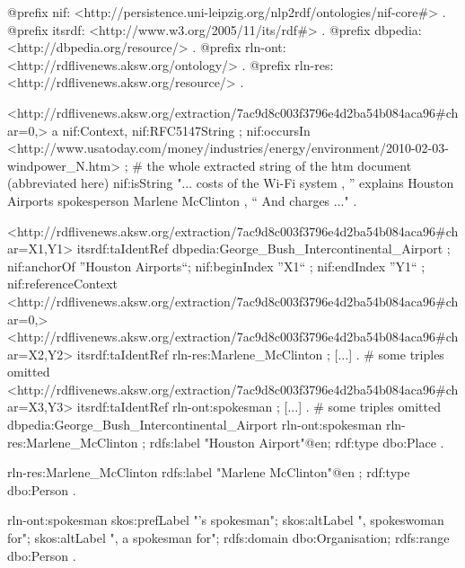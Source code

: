 @prefix nif: <http://persistence.uni-leipzig.org/nlp2rdf/ontologies/nif-core#> .
@prefix itsrdf: <http://www.w3.org/2005/11/its/rdf#> .
@prefix dbpedia: <http://dbpedia.org/resource/> .
@prefix rln-ont: <http://rdflivenews.aksw.org/ontology/> .
@prefix rln-res: <http://rdflivenews.aksw.org/resource/> .

<http://rdflivenews.aksw.org/extraction/7ac9d8c003f3796e4d2ba54b084aca96#char=0,>
    a nif:Context, nif:RFC5147String ;
    nif:occursIn <http://www.usatoday.com/money/industries/energy/environment/2010-02-03-windpower_N.htm> ;
# the whole extracted string of the htm document (abbreviated here)
    nif:isString "... costs of the Wi-Fi system , '' explains Houston Airports spokesperson Marlene McClinton , `` And charges ..." .

<http://rdflivenews.aksw.org/extraction/7ac9d8c003f3796e4d2ba54b084aca96#char=X1,Y1>
    itsrdf:taIdentRef dbpedia:George_Bush_Intercontinental_Airport ;
    nif:anchorOf ''Houston Airports``;
    nif:beginIndex ''X1`` ; nif:endIndex ''Y1`` ;
    nif:referenceContext <http://rdflivenews.aksw.org/extraction/7ac9d8c003f3796e4d2ba54b084aca96#char=0,>
<http://rdflivenews.aksw.org/extraction/7ac9d8c003f3796e4d2ba54b084aca96#char=X2,Y2>
    itsrdf:taIdentRef rln-res:Marlene_McClinton ; [...] .  # some triples omitted
<http://rdflivenews.aksw.org/extraction/7ac9d8c003f3796e4d2ba54b084aca96#char=X3,Y3>
    itsrdf:taIdentRef rln-ont:spokesman ; [...] . # some triples omitted
dbpedia:George_Bush_Intercontinental_Airport
    rln-ont:spokesman rln-res:Marlene_McClinton ;
    rdfs:label  "Houston Airport"@en;
    rdf:type    dbo:Place .

rln-res:Marlene_McClinton	
    rdfs:label  "Marlene McClinton"@en ;
    rdf:type    dbo:Person .

rln-ont:spokesman
    skos:prefLabel "'s spokesman";
    skos:altLabel ", spokeswoman for";
    skos:altLabel ", a spokesman for";
    rdfs:domain dbo:Organisation;
    rdfs:range dbo:Person .